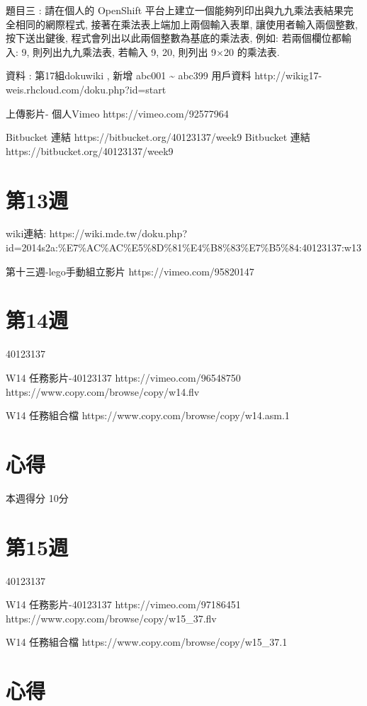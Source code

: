 \documentclass[]{article}
\begin{document}
題目三 : 請在個人的 OpenShift
平台上建立一個能夠列印出與九九乘法表結果完全相同的網際程式,
接著在乘法表上端加上兩個輸入表單, 讓使用者輸入兩個整數, 按下送出鍵後,
程式會列出以此兩個整數為基底的乘法表, 例如: 若兩個欄位都輸入: 9,
則列出九九乘法表, 若輸入 9, 20, 則列出 9×20 的乘法表.

資料 : 第17組dokuwiki , 新增 abc001 \textasciitilde{} abc399 用戶資料
http://wikig17-weis.rhcloud.com/doku.php?id=start

上傳影片- 個人Vimeo https://vimeo.com/92577964

Bitbucket 連結 https://bitbucket.org/40123137/week9 Bitbucket 連結
https://bitbucket.org/40123137/week9

\section{第13週}\label{ux7b2c13ux9031}

wiki連結:
https://wiki.mde.tw/doku.php?id=2014s2a:\%E7\%AC\%AC\%E5\%8D\%81\%E4\%B8\%83\%E7\%B5\%84:40123137:w13

第十三週-lego手動組立影片 https://vimeo.com/95820147

\section{第14週}\label{ux7b2c14ux9031}

40123137

W14 任務影片-40123137 https://vimeo.com/96548750
https://www.copy.com/browse/copy/w14.flv

W14 任務組合檔 https://www.copy.com/browse/copy/w14.asm.1

\section{心得}\label{ux5fc3ux5f97-2}

本週得分 10分

\section{第15週}\label{ux7b2c15ux9031}

40123137

W14 任務影片-40123137 https://vimeo.com/97186451
https://www.copy.com/browse/copy/w15\_37.flv

W14 任務組合檔 https://www.copy.com/browse/copy/w15\_37.1

\section{心得}\label{ux5fc3ux5f97-3}
\end{document}

